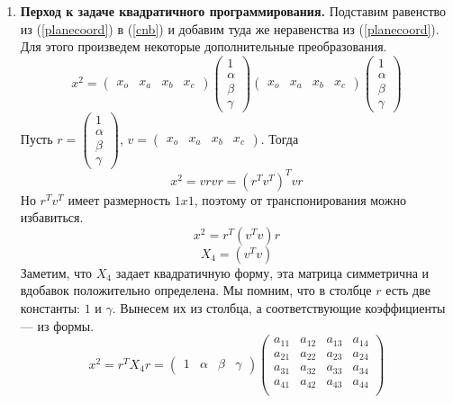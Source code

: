 \documentclass[pdftex,ptm,12pt,a4paper]{report}
\begin{document}
\begin{enumerate}
  \item
    \textbf{Перход к задаче квадратичного программирования.}
    Подставим равенство из (\ref{planecoord}) в (\ref{cnb}) и добавим туда же неравенства из (\ref{planecoord}).
    Для этого произведем некоторые дополнительные преобразования.
    \[
      x^2 = \begin{pmatrix} x_o & x_a & x_b & x_c \end{pmatrix}
             \begin{pmatrix} 1 \\ \alpha \\ \beta \\ \gamma \end{pmatrix}
             \begin{pmatrix} x_o & x_a & x_b & x_c \end{pmatrix}
             \begin{pmatrix} 1 \\ \alpha \\ \beta \\ \gamma \end{pmatrix}
    \]
    Пусть $r = \begin{pmatrix} 1 \\ \alpha \\ \beta \\ \gamma \end{pmatrix} $,
          $v = \begin{pmatrix} x_o & x_a & x_b & x_c \end{pmatrix}$.
    Тогда
    \[
      x^2 = v r v r = (r^T v^T)^T v r
    \]
    Но $r^T v^T$ имеет размерность $1x1$, поэтому от транспонирования можно избавиться.
    \[
      x^2 = r^T (v^T v) r
    \]\[
      X_4 = (v^T v)
    \]
    Заметим, что $X_4$ задает квадратичную форму, эта матрица симметрична и вдобавок положительно определена.
    Мы помним, что в столбце $r$ есть две константы: $1$ и $\gamma$.
    Вынесем их из столбца, а соответствующие коэффициенты --- из формы.
    \[
      x^2 = r^T X_4 r = 
        \begin{pmatrix} 1 & \alpha & \beta & \gamma \end{pmatrix} 
        \begin{pmatrix} 
              a_{11} & a_{12} & a_{13} & a_{14} \\ 
              a_{21} & a_{22} & a_{23} & a_{24} \\ 
              a_{31} & a_{32} & a_{33} & a_{34} \\
              a_{41} & a_{42} & a_{43} & a_{44} \\


\end{pmatrix}\]
\end{enumerate}
\end{document}
